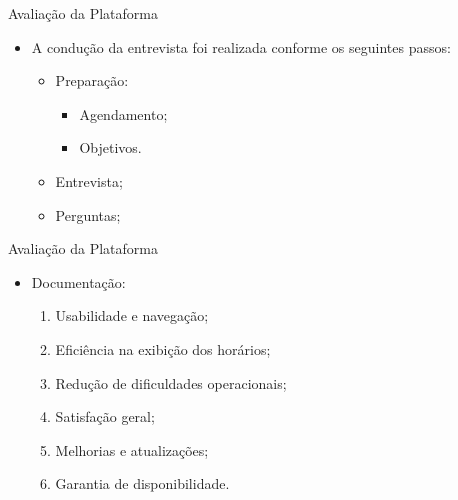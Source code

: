 \begin{frame}{Avaliação da Plataforma}
    \begin{itemize}
        \item A condução da entrevista foi realizada conforme os seguintes passos: \vspace{0.5cm}
              \begin{itemize}
                  \item Preparação: \vspace{0.5cm}
                        \begin{itemize}
                            \item Agendamento; \vspace{0.5cm}
                            \item Objetivos. \vspace{0.5cm}
                        \end{itemize}
                  \item Entrevista; \vspace{0.5cm}
                  \item Perguntas; \vspace{0.5cm}
              \end{itemize}
    \end{itemize}
\end{frame}

\begin{frame}{Avaliação da Plataforma}
    \begin{itemize}
        \item Documentação: \vspace{0.5cm}
              \begin{enumerate}
                  \item Usabilidade e navegação; \vspace{0.5cm}
                  \item Eficiência na exibição dos horários; \vspace{0.5cm}
                  \item Redução de dificuldades operacionais; \vspace{0.5cm}
                  \item Satisfação geral; \vspace{0.5cm}
                  \item Melhorias e atualizações; \vspace{0.5cm}
                  \item Garantia de disponibilidade. \vspace{0.5cm}
              \end{enumerate}
    \end{itemize}
\end{frame}

